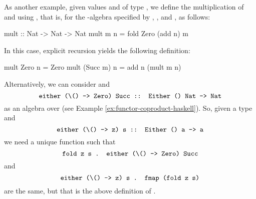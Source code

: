 \begin{example}
  As another example, given values  and 
  of type , we define the multiplication of
   and  using , that is,  for the
  -algebra specified by ,
  , and , as follows:
  \begin{codehaskell}
mult :: Nat -> Nat -> Nat
mult m n = fold Zero (add n) m
  \end{codehaskell}
  In this case, explicit recursion yields the following definition:
  \begin{codehaskell}
mult Zero     n = Zero
mult (Succ m) n = add n (mult m n)
  \end{codehaskell}

\end{example}

Alternatively, we can consider  and
\begin{equation*}
  \text{\texttt{either (\textbackslash () -> Zero) Succ :: Either () Nat -> Nat}}
\end{equation*}
as an algebra over  (see Example
\ref{ex:functor-coproduct-haskell}). So, given a type 
and
\begin{equation*}
  \text{\texttt{either (\textbackslash () -> z) s :: Either () a -> a}}
\end{equation*}
we need a unique function  such that
\begin{equation*}
  \text{\texttt{fold z s . either (\textbackslash () -> Zero) Succ}}
\end{equation*}
and
\begin{equation*}
  \text{\texttt{either (\textbackslash () -> z) s . fmap (fold z s)}}
\end{equation*}
are the same, but that is the above definition of .

